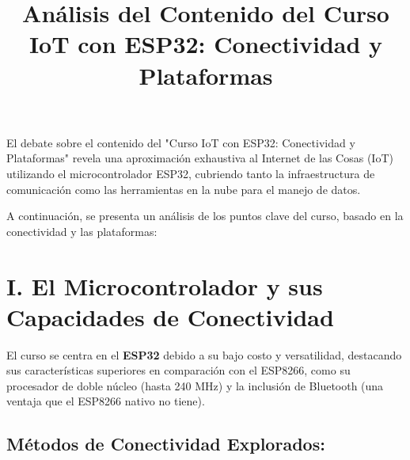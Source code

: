 \documentclass{article}
\title{Análisis del Contenido del Curso IoT con ESP32: Conectividad y Plataformas}
\author{}
\date{}
\begin{document}
\maketitle

El debate sobre el contenido del "Curso IoT con ESP32: Conectividad y Plataformas" revela una aproximación exhaustiva al Internet de las Cosas (IoT) utilizando el microcontrolador ESP32, cubriendo tanto la infraestructura de comunicación como las herramientas en la nube para el manejo de datos.

A continuación, se presenta un análisis de los puntos clave del curso, basado en la conectividad y las plataformas:

\section*{I. El Microcontrolador y sus Capacidades de Conectividad}

El curso se centra en el \textbf{ESP32} debido a su bajo costo y versatilidad, destacando sus características superiores en comparación con el ESP8266, como su procesador de doble núcleo (hasta 240 MHz) y la inclusión de Bluetooth (una ventaja que el ESP8266 nativo no tiene).

\subsection*{Métodos de Conectividad Explorados:}
\end{document}
